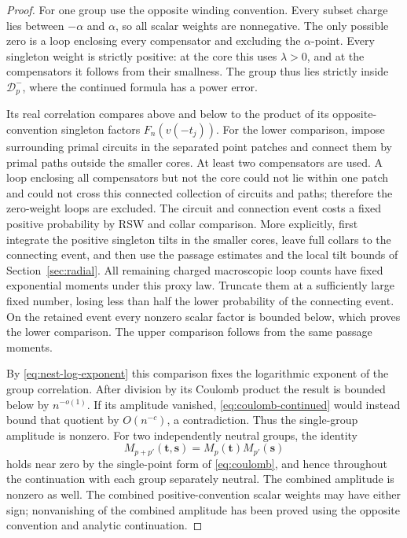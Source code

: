 \begin{proof}
For one group use the opposite winding convention.  Every subset
charge lies between $-\alpha$ and $\alpha$, so all scalar weights
are nonnegative.  The only possible zero is a loop enclosing every
compensator and excluding the $\alpha$-point.  Every singleton weight
is strictly positive: at the core this uses $\lambda>0$, and at
the compensators it follows from their smallness.  The group thus
lies strictly inside $\mathcal D_p^-$, where the continued formula
has a power error.

Its real correlation compares above and below to the product of its
opposite-convention singleton factors $F_n(v(-t_j))$.
For the lower comparison, impose surrounding primal circuits in the
separated point patches and connect them by primal paths outside the
smaller cores.  At least two compensators are used.  A loop enclosing
all compensators but not the core could not lie within one patch and
could not cross this connected collection of circuits and paths;
therefore the zero-weight loops are excluded.  The circuit and
connection event costs a fixed positive probability by RSW and
collar comparison.  More explicitly, first integrate the positive
singleton tilts in the smaller cores, leave full collars to the
connecting event, and then use the passage estimates and the local
tilt bounds of Section~\ref{sec:radial}.  All remaining charged
macroscopic loop counts have fixed exponential moments under this
proxy law.  Truncate them at a sufficiently large fixed number, losing
less than half the lower probability of the connecting event.
On the retained event every nonzero scalar factor is bounded below,
which proves the lower comparison.  The upper comparison follows
from the same passage moments.

By \eqref{eq:nest-log-exponent} this comparison fixes the logarithmic
exponent of the group correlation.  After division by its Coulomb
product the result is bounded below by $n^{-o(1)}$.
If its amplitude vanished, \eqref{eq:coulomb-continued} would instead
bound that quotient by $O(n^{-c})$, a contradiction.  Thus the
single-group amplitude is nonzero.  For two independently neutral
groups, the identity
\[
 M_{p+p'}(\mathbf t,\mathbf s)=M_p(\mathbf t)M_{p'}(\mathbf s)
\]
holds near zero by the single-point form of
\eqref{eq:coulomb}, and hence throughout the continuation with
each group separately neutral.  The combined amplitude is nonzero
as well.  The combined positive-convention scalar weights may have
either sign; nonvanishing of the combined amplitude has been proved
using the opposite convention and analytic continuation.


\end{proof}
